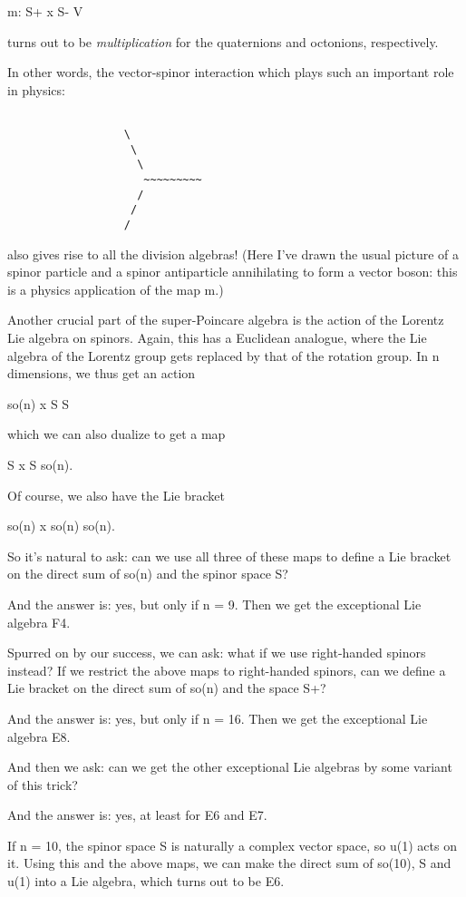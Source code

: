 m: S+ x S- \to  V

turns out to be \emph{multiplication} for the quaternions and octonions, 
respectively.  

In other words, the vector-spinor interaction which plays such an
important role in physics:


\begin{verbatim}

                  \
                   \
                    \
                     ~~~~~~~~~
                    /
                   /
                  /

\end{verbatim}
    
also gives rise to all the division algebras!  (Here I've drawn the
usual picture of a spinor particle and a spinor antiparticle annihilating 
to form a vector boson: this is a physics application of the map m.)

Another crucial part of the super-Poincare algebra is the action of the 
Lorentz Lie algebra on spinors.  Again, this has a Euclidean analogue,
where the Lie algebra of the Lorentz group gets replaced by that of 
the rotation group.  In n dimensions, we thus get an action

so(n) x S \to  S

which we can also dualize to get a map

S x S \to  so(n).

Of course, we also have the Lie bracket

so(n) x so(n) \to  so(n).

So it's natural to ask: can we use all three of these maps to define
a Lie bracket on the direct sum of so(n) and the spinor space S?

And the answer is: yes, but only if n = 9.  Then we get the exceptional
Lie algebra F4.  

Spurred on by our success, we can ask: what if we use right-handed
spinors instead?  If we restrict the above maps to right-handed spinors,
can we define a Lie bracket on the direct sum of so(n) and the space S+?

And the answer is: yes, but only if n = 16.  Then we get the exceptional
Lie algebra E8.

And then we ask: can we get the other exceptional Lie algebras by some
variant of this trick?  

And the answer is: yes, at least for E6 and E7.  

If n = 10, the spinor space S is naturally a complex vector space, so
u(1) acts on it.  Using this and the above maps, we can make the direct
sum of so(10), S and u(1) into a Lie algebra, which turns out to be E6.

